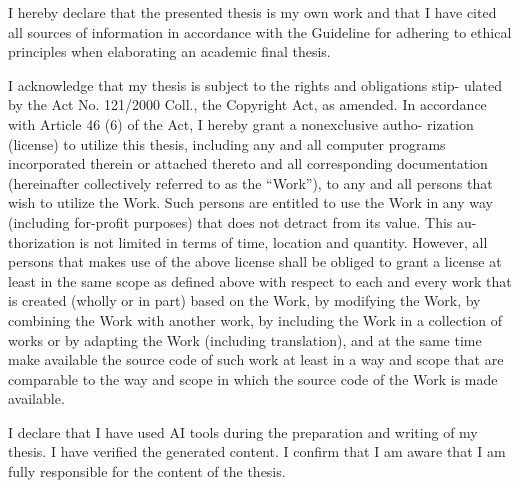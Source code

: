 \documentclass[english,bachelor,unicode,oneside]{ctufit-thesis}
\begin{document}
\begin{declarationpage}
    I hereby declare that the presented thesis is my own work and that I have cited all sources of information in accordance with the Guideline for adhering to ethical principles when elaborating an academic final thesis.

    I acknowledge that my thesis is subject to the rights and obligations stip- ulated by the Act No. 121/2000 Coll.,  the Copyright Act,  as amended.   In accordance with Article 46 (6) of the Act, I hereby grant a nonexclusive autho- rization (license) to utilize this thesis, including any and all computer programs incorporated therein or attached thereto and all corresponding documentation (hereinafter collectively referred to as the “Work”), to any and all persons that wish to utilize the Work. Such persons are entitled to use the Work in any way (including for-profit purposes) that does not detract from its value. This au- thorization is not limited in terms of time, location and quantity. However, all persons that makes use of the above license shall be obliged to grant a license at least in the same scope as defined above with respect to each and every work that is created (wholly or in part) based on the Work, by modifying the Work, by combining the Work with another work, by including the Work in a collection of works or by adapting the Work (including translation), and at the same time make available the source code of such work at least in a way and scope that are comparable to the way and scope in which the source code of the Work is made available.

    I declare that I have used AI tools during the preparation and writing of my thesis. I have verified the generated content. I confirm that I am aware that I am fully responsible for the content of the thesis.
\end{declarationpage}

\printabstractpage %
\end{document}
